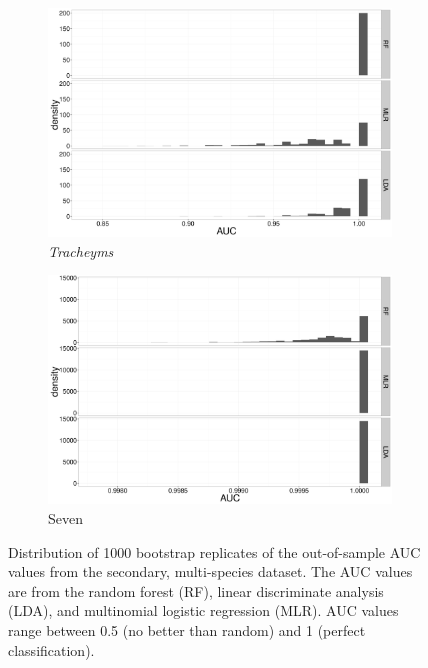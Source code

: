 \documentclass[12pt,letterpaper]{article}
\begin{document}
\begin{figure}[ht]
  \centering
  \begin{subfigure}[h]{0.45\linewidth}
    \includegraphics[height = 0.3\textheight, width = \textwidth, keepaspectratio = true]{figure/trach_boot}
    \caption{\textit{Tracheyms}}
    \label{fig:trach_boot}
  \end{subfigure}
  \begin{subfigure}[h]{0.45\linewidth}
    \includegraphics[height = 0.3\textheight, width = \textwidth, keepaspectratio = true]{figure/seven_boot}
    \caption{Seven}
    \label{fig:seven_boot}
  \end{subfigure}
  \caption{Distribution of 1000 bootstrap replicates of the out-of-sample AUC values from the secondary, multi-species dataset. The AUC values are from the random forest (RF), linear discriminate analysis (LDA), and multinomial logistic regression (MLR). AUC values range between 0.5 (no better than random) and 1 (perfect classification).}
  \label{fig:other_boot}
\end{figure}
\end{document}
